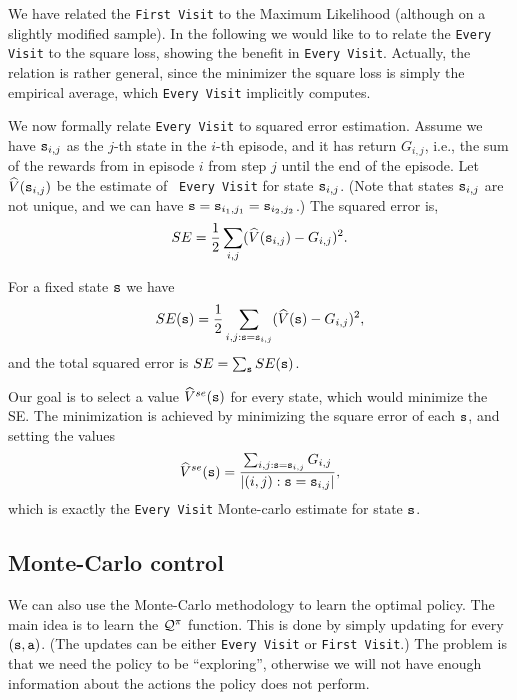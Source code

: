 \begin{advanced}
We have related the {\tt First Visit} to the Maximum Likelihood (although on a slightly modified sample).
In the following we would like to to relate the {\tt Every Visit} to the square loss, showing the benefit in {\tt Every Visit}.
Actually, the relation is rather general, since the minimizer the square loss is simply the empirical average, which {\tt Every Visit} implicitly computes.

We now formally relate {\tt Every Visit} to squared error estimation. Assume we have ${\tt s}_{i,j}$ as the $j$-th state
in the $i$-th episode, and it has return $G_{i,j}$, i.e., the sum of
the rewards from in episode $i$ from step $j$ until the end of the
episode. Let $\widehat{V}({\tt s}_{i,j})$ be the estimate of {\tt
Every Visit} for state ${\tt s}_{i,j}$. (Note that states
${\tt s}_{i,j}$ are not unique, and we can have
${\tt s}={\tt s}_{i_1,j_1}={\tt s}_{i_2,j_2}$.) The squared error is,
\[
SE=\frac{1}{2}\sum_{i,j} (\widehat{V}({\tt s}_{i,j})-G_{i,j})^2.
\]

For a fixed state ${\tt s}$ we have
\[
SE({\tt s})=\frac{1}{2}\sum_{i,j:{\tt s}={\tt s}_{i,j}}
(\widehat{V}({\tt s})-G_{i,j})^2,
\]
and the total squared error is $SE=\sum_{\tt s} SE({\tt s})$.

Our goal is to select a value $\widehat{V}^{se}({\tt s})$ for every
state, which would minimize the SE. The minimization is achieved by
minimizing the square error of each ${\tt s}$, and setting the values
\[
\widehat{V}^{se}({\tt s})=\frac{\sum_{i,j:{\tt s}={\tt s}_{i,j}}
G_{i,j}}{|{(i,j):{\tt s}={\tt s}_{i,j}}|},
\]
which is exactly the {\tt Every Visit} Monte-carlo estimate for
state ${\tt s}$.
\end{advanced}

\subsection{Monte-Carlo control}

We can also use the Monte-Carlo methodology to learn the optimal
policy.
%
The main idea is to learn the $\mathcal{Q}^\pi$ function. This is done by
simply updating for every $({\tt s},{\tt a})$. (The updates can be
either {\tt Every Visit} or {\tt First Visit}.) The problem is that
we need the policy to be ``exploring'', otherwise we will not have
enough information about the actions the policy does not perform.

